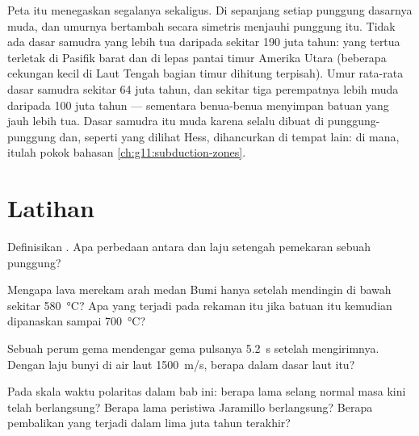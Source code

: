 Peta itu menegaskan segalanya sekaligus. Di sepanjang setiap punggung
dasarnya muda, dan umurnya bertambah secara simetris menjauhi punggung itu.
Tidak ada dasar samudra yang lebih tua daripada sekitar \num{190} juta tahun:
yang tertua terletak di Pasifik barat dan di lepas pantai timur Amerika Utara
(beberapa cekungan kecil di Laut Tengah bagian timur dihitung terpisah). Umur
rata-rata dasar samudra sekitar \num{64} juta tahun, dan sekitar tiga
perempatnya lebih muda daripada 100 juta tahun --- sementara benua-benua
menyimpan batuan yang jauh lebih tua. Dasar samudra itu muda karena selalu
dibuat di punggung-punggung dan, seperti yang dilihat Hess, dihancurkan di
tempat lain: di mana, itulah pokok bahasan \cref{ch:g11:subduction-zones}.

\section{Latihan}

\begin{exercise}[$\star$]\label{exo:g11:drift-to-spreading:1}
Definisikan . Apa perbedaan antara 
dan laju setengah pemekaran sebuah punggung?
\end{exercise}

\begin{exercise}[$\star$]\label{exo:g11:drift-to-spreading:2}
Mengapa lava merekam arah medan Bumi hanya setelah mendingin di bawah sekitar
\qty{580}{\celsius}? Apa yang terjadi pada rekaman itu jika batuan itu kemudian
dipanaskan sampai \qty{700}{\celsius}?
\end{exercise}

\begin{exercise}[$\star$]\label{exo:g11:drift-to-spreading:3}
Sebuah perum gema mendengar gema pulsanya \qty{5.2}{s} setelah mengirimnya.
Dengan laju bunyi di air laut \qty{1500}{m/s}, berapa dalam dasar laut itu?
\end{exercise}

\begin{exercise}[$\star$]\label{exo:g11:drift-to-spreading:4}
Pada skala waktu polaritas dalam bab ini: berapa lama selang normal masa kini
telah berlangsung? Berapa lama peristiwa Jaramillo berlangsung? Berapa
pembalikan yang terjadi dalam lima juta tahun terakhir?
\end{exercise}


